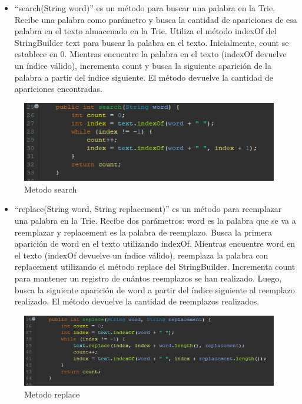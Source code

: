 \documentclass{article}
\begin{document}
   \clearpage
   \begin{itemize}
        \item “search(String word)” es un método para buscar una palabra en la Trie. Recibe una palabra como parámetro y busca la cantidad de apariciones de esa palabra en el texto almacenado en la Trie. Utiliza el método indexOf del StringBuilder text para buscar la palabra en el texto. Inicialmente, count se establece en 0. Mientras encuentre la palabra en el texto (indexOf devuelve un índice válido), incrementa count y busca la siguiente aparición de la palabra a partir del índice siguiente. El método devuelve la cantidad de apariciones encontradas.
   \end{itemize}
   \begin{figure}[H]
       \centering
       \includegraphics{img/img11.png}
       \caption{Metodo search}
       \label{fig:enter-label}
   \end{figure}
   \begin{itemize}
    \item “replace(String word, String replacement)” es un método para reemplazar una palabra en la Trie. Recibe dos parámetros: word es la palabra que se va a reemplazar y replacement es la palabra de reemplazo. Busca la primera aparición de word en el texto utilizando indexOf. Mientras encuentre word en el texto (indexOf devuelve un índice válido), reemplaza la palabra con replacement utilizando el método replace del StringBuilder. Incrementa count para mantener un registro de cuántos reemplazos se han realizado. Luego, busca la siguiente aparición de word a partir del índice siguiente al reemplazo realizado. El método devuelve la cantidad de reemplazos realizados.
   \end{itemize}
   \begin{figure}[H]
       \centering
       \includegraphics{img/img 12.png}
       \caption{Metodo replace}
       \label{fig:enter-label}
   \end{figure}
\end{document}

